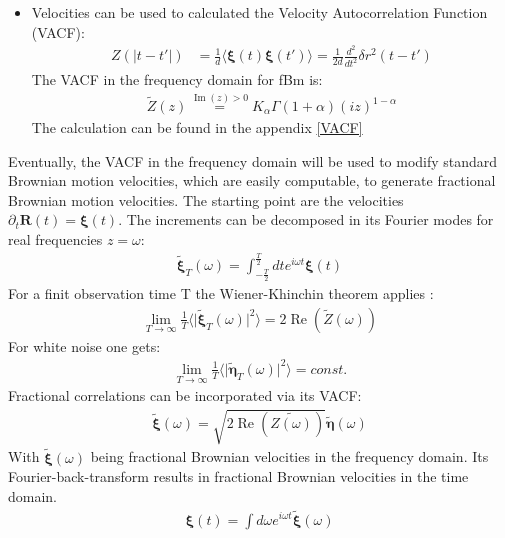 \documentclass[
  a4paper,BCOR10mm,oneside,
  bibtotoc,idxtotoc,
  headsepline,footsepline,%
  fleqn,openbib
]{scrbook}
\begin{document}
\begin{itemize} 
\item Velocities can be used to calculated the Velocity Autocorrelation Function (VACF):
\begin{align}
Z(|t-t'|)&= \frac{1}{d}\langle \bm{\xi}(t) \bm{\xi}(t') \rangle = \frac{1}{2d} \frac{d^2}{dt^2} \delta r^2 (t-t')  
\end{align}
The VACF in the frequency domain for fBm is: 
\begin{align}
  \tilde{Z}(z) \stackrel{\operatorname{Im}(z)> 0} {=}  K_{\alpha} \Gamma(1+\alpha)(i z)^{1-\alpha}
\end{align}
The calculation can be found in the appendix \ref{VACF}
\end{itemize}
Eventually, the VACF in the frequency domain will be used to modify standard Brownian motion velocities, which are easily computable, to generate fractional Brownian motion velocities. The starting point are the velocities $\partial_t \bm{R}(t)=\bm{\xi}(t)$. The increments can be decomposed in its Fourier modes for real frequencies $z=\omega$:
\begin{align}
 \tilde{\bm{\xi}}_{T}(\omega)=\int_{-\frac{T}{2}}^{\frac{T}{2}} dt e^{i \omega t} \bm{\xi}(t) \label{eq:fourier}
\end{align}
For a finit observation time T the Wiener-Khinchin theorem applies :
\begin{align}
 \lim_{T\to\infty}\frac{1}{T}\langle \lvert  \tilde{\bm{\xi}}_{T}(\omega) \rvert^2  \rangle = 2  \operatorname{Re} \left(\tilde{Z}(\omega)\right)
\end{align}
For white noise one gets: 
\begin{align}
 \lim_{T\to\infty}\frac{1}{T}\langle \lvert  \tilde{\bm{\eta}}_{T}(\omega) \rvert^2 \rangle = const.
\end{align}
Fractional correlations can be incorporated via its VACF:
\begin{align}
\tilde{\bm{\xi}}(\omega) = \sqrt{2 \operatorname{Re} \left(\tilde{Z(\omega)}\right)}  \tilde{\bm{\eta}}(\omega) \label{eq:fracvacf}
\end{align}
 With $\tilde{\bm{\xi}}(\omega)$ being fractional Brownian velocities in the frequency domain. Its Fourier-back-transform results in fractional Brownian velocities in the time domain.
\begin{align}
\bm{\xi}(t)=\int d \omega e^{i \omega t} \tilde{\bm{\xi}}(\omega) \label{eq:fourier2}
\end{align}
\end{document}
